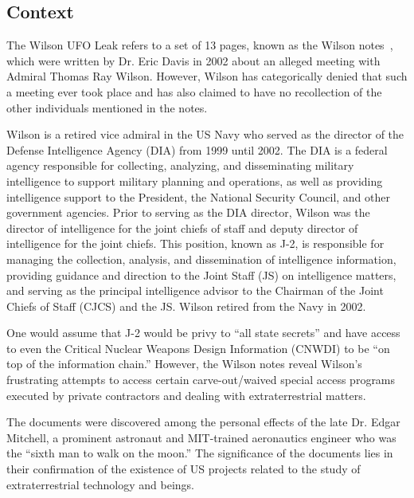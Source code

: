 \subsection{Context}

The Wilson UFO Leak refers to a set of 13 pages, known as the Wilson notes~\cite{WilsonNotes-Davis}, which were written by Dr. Eric Davis in 2002 about an alleged meeting with Admiral Thomas Ray Wilson. However, Wilson has categorically denied that such a meeting ever took place\cite[Chapters 9, 21, Ref. 9.23]{Coulthart2021Aug} and has also claimed to have no recollection of the other individuals mentioned in the notes\cite{cox20, Cox2021Aug}.

Wilson is a retired vice admiral in the US Navy who served as the director of the Defense Intelligence Agency (DIA) from 1999 until 2002. The DIA is a federal agency responsible for collecting, analyzing, and disseminating military intelligence to support military planning and operations, as well as providing intelligence support to the President, the National Security Council, and other government agencies. Prior to serving as the DIA director, Wilson was the director of intelligence for the joint chiefs of staff and deputy director of intelligence for the joint chiefs. This position, known as J-2, is responsible for managing the collection, analysis, and dissemination of intelligence information, providing guidance and direction to the Joint Staff (JS) on intelligence matters, and serving as the principal intelligence advisor to the Chairman of the Joint Chiefs of Staff (CJCS) and the JS. Wilson retired from the Navy in 2002.

One would assume that J-2 would be privy to ``all state secrets'' and have access to even the Critical Nuclear Weapons Design Information (CNWDI) to be ``on top of the information chain.'' However, the Wilson notes reveal Wilson's frustrating attempts to access certain carve-out/waived special access programs executed by private contractors and dealing with extraterrestrial matters.

The documents were discovered among the personal effects of the late Dr. Edgar Mitchell, a prominent astronaut and MIT-trained aeronautics engineer who was the ``sixth man to walk on the moon.'' The significance of the documents lies in their confirmation of the existence of US projects related to the study of extraterrestrial technology and beings.

